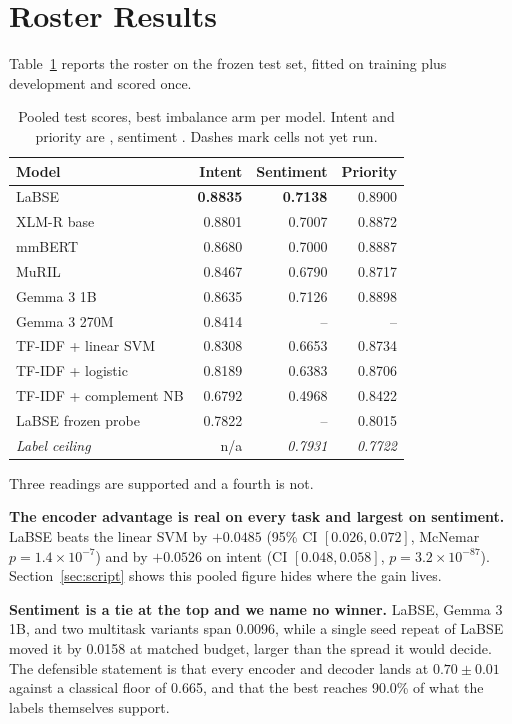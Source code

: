 \section{Roster Results}
\label{sec:results}

Table~\ref{tab:pooled} reports the roster on the frozen test set, fitted on
training plus development and scored once.

\begin{table}[t]
\caption{Pooled test scores, best imbalance arm per model. Intent and priority
are \macrof{}, sentiment \negf{}. Dashes mark cells not yet run.}
\label{tab:pooled}
\centering
\small
\begin{tabular}{lrrr}
\toprule
Model & Intent & Sentiment & Priority \\
\midrule
LaBSE                  & \textbf{0.8835} & \textbf{0.7138} & 0.8900 \\
XLM-R base             & 0.8801 & 0.7007 & 0.8872 \\
mmBERT                 & 0.8680 & 0.7000 & 0.8887 \\
MuRIL                  & 0.8467 & 0.6790 & 0.8717 \\
Gemma 3 1B             & 0.8635 & 0.7126 & 0.8898 \\
Gemma 3 270M           & 0.8414 & --     & --     \\
TF-IDF + linear SVM    & 0.8308 & 0.6653 & 0.8734 \\
TF-IDF + logistic      & 0.8189 & 0.6383 & 0.8706 \\
TF-IDF + complement NB & 0.6792 & 0.4968 & 0.8422 \\
LaBSE frozen probe     & 0.7822 & --     & 0.8015 \\
\midrule
\emph{Label ceiling}   & n/a & \emph{0.7931} & \emph{0.7722} \\
\bottomrule
\end{tabular}
\end{table}

Three readings are supported and a fourth is not.

\textbf{The encoder advantage is real on every task and largest on sentiment.}
LaBSE beats the linear SVM by $+0.0485$ \negf{} (95\% CI $[0.026, 0.072]$,
McNemar $p=1.4\times10^{-7}$) and by $+0.0526$ \macrof{} on intent (CI
$[0.048, 0.058]$, $p=3.2\times10^{-87}$). Section~\ref{sec:script} shows this
pooled figure hides where the gain lives.

\textbf{Sentiment is a tie at the top and we name no winner.} LaBSE, Gemma 3 1B,
and two multitask variants span 0.0096, while a single seed repeat of LaBSE moved
it by 0.0158 at matched budget, larger than the spread it would decide. The
defensible statement is that every encoder and decoder lands at $0.70\pm0.01$
against a classical floor of 0.665, and that the best reaches 90.0\% of what the
labels themselves support.

